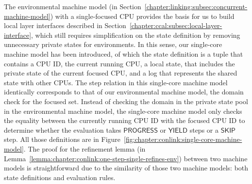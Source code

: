 The environmental machine model 
(in Section~\ref{chapter:linking:subsec:concurrent-machine-model})
 with a single-focused CPU provides the 
basis for us to build local layer interfaces described in Section~\ref{chapter:ccal:subsec:local-layer-interface},
which still requires simplification on the state definition by 
removing unnecessary private states for environments. 
In this sense, our single-core machine model has been introduced,
of which the state definition is a tuple that contains 
a CPU ID, the current running CPU, 
a local state, that includes the private state of the current focused CPU,
and a log that represents the shared state with other CPUs. 
The step relation in this single-core machine model identically corresponds to that of our environmental machine model,
the domain check for the focused set. 
Instead of checking the domain in the private state pool in the environmental machine model, 
the single-core machine model only checks the equality between the currently running CPU ID with the focused CPU ID to determine whether the evaluation takes $\textsf{PROGRESS}$ or $\textsf{YIELD}$ steps or a $\textsf{SKIP}$ step. 
All those definitions are in Figure~\ref{fig:chapter:conlink:single-core-machine-model}.
The proof for the refinement lemma (in Lemma~\ref{lemma:chapter:conlink:one-step-single-refines-env}) between two machine models is straightforward due to the similarity of those two machine models: both state definitions and evaluation rules. 

%
%



